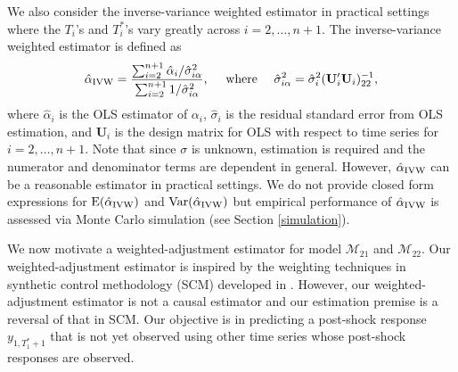 \documentclass[11pt]{article}
\def\mbf#1{\mathbf{#1}} %
\def\mc#1{\mathcal{#1}} %
\def\E#1{\mathrm{E}(#1)} %
\def\var#1{\mathrm{Var}(#1)} %
\theoremstyle{definition}
\begin{document}
We also consider the inverse-variance weighted estimator 
in practical settings where the $T_i$'s and $T_i^*$'s vary greatly across $i=2, \ldots, n+1$. 
The inverse-variance weighted estimator is defined as 
\begin{align*}
  \hat{\alpha}_{\rm IVW} = \frac{\sum_{i=2}^{n+1} \hat{\alpha}_i / \hat{\sigma}_{i\alpha}^2}{\sum_{i=2}^{n+1} 1/\hat{\sigma}_{i\alpha}^2},
  \quad \text{ where } \quad  \hat{\sigma}_{i\alpha}^2 = \hat{\sigma}^2_i( \mathbf{U}_i'\mbf{U}_i)_{22}^{-1},
\end{align*}
where  $\hat{\alpha}_i$ is the OLS estimator of $\alpha_i$, 
$\hat{\sigma}_i$ is the residual standard error from OLS estimation, 
and $\mbf{U}_i$ is the design matrix for OLS with respect to time series 
for $i = 2, \ldots, n+1$. Note that since $\sigma$ is unknown, estimation 
is required and the numerator and denominator terms are dependent in general. 
However, $\hat{\alpha}_{\rm IVW}$ can be a reasonable estimator in 
practical settings. %
We do not provide closed form expressions for $\E{\hat{\alpha}_{\rm IVW}}$ 
and $\var{\hat{\alpha}_{\rm IVW}}$ but empirical performance of 
$\hat{\alpha}_{\rm IVW}$ is assessed via Monte Carlo simulation 
(see Section \ref{simulation}).


We now motivate a weighted-adjustment estimator for model $\mc{M}_{21}$ 
and $\mc{M}_{22}$. Our weighted-adjustment estimator is inspired by the 
weighting techniques in synthetic control methodology (SCM) developed 
in \cite{abadie2010synthetic}. 
However, our weighted-adjustment estimator is not a causal estimator and 
our estimation premise is a reversal of that in SCM. 
Our objective is in predicting a post-shock response $y_{1,T_1^*+1}$ that is not yet 
observed using other time series whose post-shock responses are observed.
\end{document}
